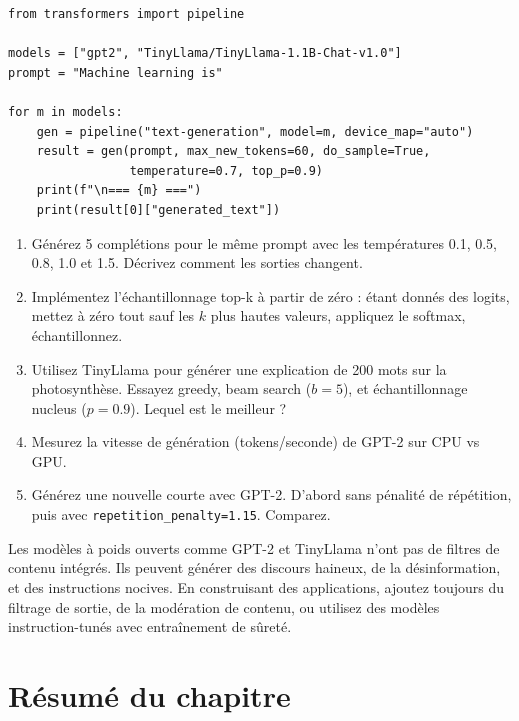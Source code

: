 \begin{verbatim}
from transformers import pipeline

models = ["gpt2", "TinyLlama/TinyLlama-1.1B-Chat-v1.0"]
prompt = "Machine learning is"

for m in models:
    gen = pipeline("text-generation", model=m, device_map="auto")
    result = gen(prompt, max_new_tokens=60, do_sample=True,
                 temperature=0.7, top_p=0.9)
    print(f"\n=== {m} ===")
    print(result[0]["generated_text"])
\end{verbatim}

\begin{exercise}
\begin{enumerate}
  \item G\'en\'erez 5 compl\'etions pour le m\^eme prompt avec les temp\'eratures 0.1, 0.5, 0.8, 1.0 et 1.5. D\'ecrivez comment les sorties changent.
  \item Impl\'ementez l'\'echantillonnage top-k \`a partir de z\'ero : \'etant donn\'es des logits, mettez \`a z\'ero tout sauf les $k$ plus hautes valeurs, appliquez le softmax, \'echantillonnez.
  \item Utilisez TinyLlama pour g\'en\'erer une explication de 200 mots sur la photosynth\`ese. Essayez greedy, beam search ($b=5$), et \'echantillonnage nucleus ($p=0.9$). Lequel est le meilleur ?
  \item Mesurez la vitesse de g\'en\'eration (tokens/seconde) de GPT-2 sur CPU vs GPU.
  \item G\'en\'erez une nouvelle courte avec GPT-2. D'abord sans p\'enalit\'e de r\'ep\'etition, puis avec \texttt{repetition\_penalty=1.15}. Comparez.
\end{enumerate}
\end{exercise}

\begin{ethicsbox}
Les mod\`eles \`a poids ouverts comme GPT-2 et TinyLlama n'ont pas de filtres de contenu int\'egr\'es. Ils peuvent g\'en\'erer des discours haineux, de la d\'esinformation, et des instructions nocives. En construisant des applications, ajoutez toujours du filtrage de sortie, de la mod\'eration de contenu, ou utilisez des mod\`eles instruction-tun\'es avec entra\^inement de s\^uret\'e.
\end{ethicsbox}

\section{R\'esum\'e du chapitre}


